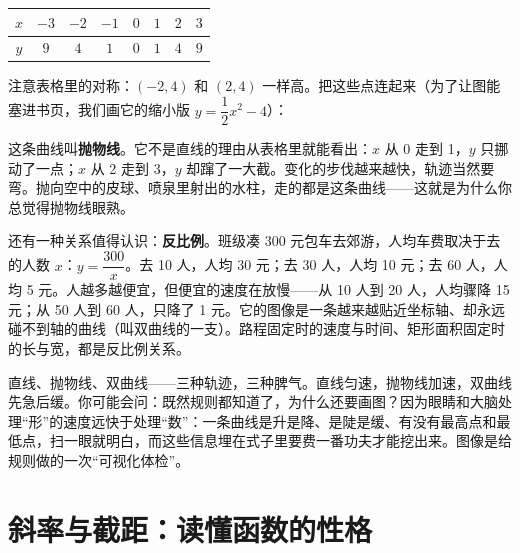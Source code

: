 \begin{center}
\begin{tabular}{cccccccc}
\toprule
$x$ & $-3$ & $-2$ & $-1$ & $0$ & $1$ & $2$ & $3$ \\
\midrule
$y$ & $9$ & $4$ & $1$ & $0$ & $1$ & $4$ & $9$ \\
\bottomrule
\end{tabular}
\end{center}

注意表格里的对称：$(-2, 4)$ 和 $(2, 4)$ 一样高。把这些点连起来（为了让图能塞进书页，我们画它的缩小版 $y = \dfrac{1}{2}x^2 - 4$）：

\begin{center}
\end{center}

这条曲线叫\textbf{抛物线}。它不是直线的理由从表格里就能看出：$x$ 从 0 走到 1，$y$ 只挪动了一点；$x$ 从 2 走到 3，$y$ 却蹿了一大截。变化的步伐越来越快，轨迹当然要弯。抛向空中的皮球、喷泉里射出的水柱，走的都是这条曲线——这就是为什么你总觉得抛物线眼熟。

还有一种关系值得认识：\textbf{反比例}。班级凑 300 元包车去郊游，人均车费取决于去的人数 $x$：$y = \dfrac{300}{x}$。去 10 人，人均 30 元；去 30 人，人均 10 元；去 60 人，人均 5 元。人越多越便宜，但便宜的速度在放慢——从 10 人到 20 人，人均骤降 15 元；从 50 人到 60 人，只降了 1 元。它的图像是一条越来越贴近坐标轴、却永远碰不到轴的曲线（叫双曲线的一支）。路程固定时的速度与时间、矩形面积固定时的长与宽，都是反比例关系。

直线、抛物线、双曲线——三种轨迹，三种脾气。直线匀速，抛物线加速，双曲线先急后缓。你可能会问：既然规则都知道了，为什么还要画图？因为眼睛和大脑处理“形”的速度远快于处理“数”：一条曲线是升是降、是陡是缓、有没有最高点和最低点，扫一眼就明白，而这些信息埋在式子里要费一番功夫才能挖出来。图像是给规则做的一次“可视化体检”。

\section{斜率与截距：读懂函数的性格}

